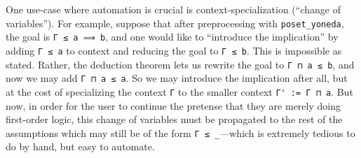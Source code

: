 \documentclass[a4paper,USenglish,cleveref, autoref]{lipics-v2019}
\theoremstyle{definition}
\begin{document}
One use-case where automation is crucial is context-specialization (``change of variables''). For example, suppose that after preprocessing with \lstinline{poset_yoneda}, the goal is \lstinline{Γ ≤ a ⟹ b}, and one would like to ``introduce the implication'' by adding \lstinline{Γ ≤ a} to context and reducing the goal to \lstinline{Γ ≤ b}. This is impossible as stated. Rather, the deduction theorem lets us rewrite the goal to \lstinline{Γ ⊓ a ≤ b}, and now we may add \lstinline{Γ ⊓ a ≤ a}. So we may introduce the implication after all, but at the cost of specializing the context \lstinline{Γ} to the smaller context \lstinline{Γ' := Γ ⊓ a}. But now, in order for the user to continue the pretense that they are merely doing first-order logic, this change of variables must be propagated to the rest of the assumptions which may still be of the form \lstinline{Γ ≤ _}---which is extremely tedious to do by hand, but easy to automate.

\end{document}
